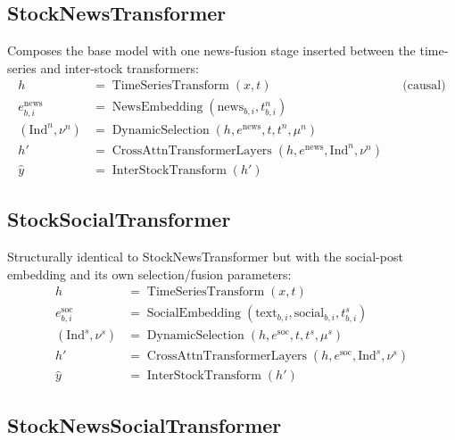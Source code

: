 \documentclass[stu,floatsintext]{apa7}
\begin{document}
\subsection{StockNewsTransformer}

Composes the base model with one news-fusion stage inserted between the time-series and inter-stock
transformers:
\begin{align}
  h &= \operatorname{TimeSeriesTransform}(x,t) && \text{(causal)} \\
  e^{\mathrm{news}}_{b,i} &= \operatorname{NewsEmbedding}(\mathrm{news}_{b,i}, t^{n}_{b,i}) \\
  (\mathrm{Ind}^{n},\nu^{n}) &= \operatorname{DynamicSelection}(h, e^{\mathrm{news}}, t, t^{n}, \mu^{n})
  && \text{ } \\
  h' &= \operatorname{CrossAttnTransformerLayers}(h, e^{\mathrm{news}}, \mathrm{Ind}^{n}, \nu^{n})
  && \text{ } \\
  \hat y &= \operatorname{InterStockTransform}(h') && \text{ }
\end{align}

\subsection{StockSocialTransformer}

Structurally identical to StockNewsTransformer but with the social-post embedding and its own
selection/fusion parameters:
\begin{align}
  h &= \operatorname{TimeSeriesTransform}(x,t) \\
  e^{\mathrm{soc}}_{b,i} &= \operatorname{SocialEmbedding}(\mathrm{text}_{b,i}, \mathrm{social}_{b,i}, t^{s}_{b,i}) \\
  (\mathrm{Ind}^{s},\nu^{s}) &= \operatorname{DynamicSelection}(h, e^{\mathrm{soc}}, t, t^{s}, \mu^{s}) \\
  h' &= \operatorname{CrossAttnTransformerLayers}(h, e^{\mathrm{soc}}, \mathrm{Ind}^{s}, \nu^{s}) \\
  \hat y &= \operatorname{InterStockTransform}(h')
\end{align}

\subsection{StockNewsSocialTransformer}
\end{document}
